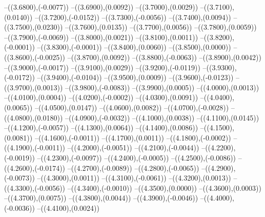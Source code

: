 {	--({\sx*(3.6800)},{\sy*(-0.0077)})
	--({\sx*(3.6900)},{\sy*(0.0092)})
	--({\sx*(3.7000)},{\sy*(0.0029)})
	--({\sx*(3.7100)},{\sy*(0.0140)})
	--({\sx*(3.7200)},{\sy*(-0.0152)})
	--({\sx*(3.7300)},{\sy*(-0.0056)})
	--({\sx*(3.7400)},{\sy*(0.0094)})
	--({\sx*(3.7500)},{\sy*(0.0230)})
	--({\sx*(3.7600)},{\sy*(0.0135)})
	--({\sx*(3.7700)},{\sy*(0.0056)})
	--({\sx*(3.7800)},{\sy*(0.0059)})
	--({\sx*(3.7900)},{\sy*(-0.0069)})
	--({\sx*(3.8000)},{\sy*(0.0021)})
	--({\sx*(3.8100)},{\sy*(0.0011)})
	--({\sx*(3.8200)},{\sy*(-0.0001)})
	--({\sx*(3.8300)},{\sy*(-0.0001)})
	--({\sx*(3.8400)},{\sy*(0.0060)})
	--({\sx*(3.8500)},{\sy*(0.0000)})
	--({\sx*(3.8600)},{\sy*(-0.0025)})
	--({\sx*(3.8700)},{\sy*(0.0092)})
	--({\sx*(3.8800)},{\sy*(-0.0063)})
	--({\sx*(3.8900)},{\sy*(0.0042)})
	--({\sx*(3.9000)},{\sy*(-0.0017)})
	--({\sx*(3.9100)},{\sy*(0.0029)})
	--({\sx*(3.9200)},{\sy*(-0.0119)})
	--({\sx*(3.9300)},{\sy*(-0.0172)})
	--({\sx*(3.9400)},{\sy*(-0.0104)})
	--({\sx*(3.9500)},{\sy*(0.0009)})
	--({\sx*(3.9600)},{\sy*(-0.0123)})
	--({\sx*(3.9700)},{\sy*(0.0013)})
	--({\sx*(3.9800)},{\sy*(-0.0083)})
	--({\sx*(3.9900)},{\sy*(0.0005)})
	--({\sx*(4.0000)},{\sy*(0.0013)})
	--({\sx*(4.0100)},{\sy*(0.0004)})
	--({\sx*(4.0200)},{\sy*(-0.0002)})
	--({\sx*(4.0300)},{\sy*(0.0091)})
	--({\sx*(4.0400)},{\sy*(0.0065)})
	--({\sx*(4.0500)},{\sy*(0.0147)})
	--({\sx*(4.0600)},{\sy*(0.0082)})
	--({\sx*(4.0700)},{\sy*(-0.0028)})
	--({\sx*(4.0800)},{\sy*(0.0180)})
	--({\sx*(4.0900)},{\sy*(-0.0032)})
	--({\sx*(4.1000)},{\sy*(0.0038)})
	--({\sx*(4.1100)},{\sy*(0.0145)})
	--({\sx*(4.1200)},{\sy*(-0.0057)})
	--({\sx*(4.1300)},{\sy*(0.0064)})
	--({\sx*(4.1400)},{\sy*(0.0086)})
	--({\sx*(4.1500)},{\sy*(0.0081)})
	--({\sx*(4.1600)},{\sy*(-0.0011)})
	--({\sx*(4.1700)},{\sy*(0.0011)})
	--({\sx*(4.1800)},{\sy*(-0.0002)})
	--({\sx*(4.1900)},{\sy*(-0.0011)})
	--({\sx*(4.2000)},{\sy*(-0.0051)})
	--({\sx*(4.2100)},{\sy*(-0.0044)})
	--({\sx*(4.2200)},{\sy*(-0.0019)})
	--({\sx*(4.2300)},{\sy*(-0.0097)})
	--({\sx*(4.2400)},{\sy*(-0.0005)})
	--({\sx*(4.2500)},{\sy*(-0.0086)})
	--({\sx*(4.2600)},{\sy*(-0.0174)})
	--({\sx*(4.2700)},{\sy*(-0.0089)})
	--({\sx*(4.2800)},{\sy*(-0.0065)})
	--({\sx*(4.2900)},{\sy*(-0.0073)})
	--({\sx*(4.3000)},{\sy*(0.0011)})
	--({\sx*(4.3100)},{\sy*(-0.0061)})
	--({\sx*(4.3200)},{\sy*(0.0013)})
	--({\sx*(4.3300)},{\sy*(-0.0056)})
	--({\sx*(4.3400)},{\sy*(-0.0010)})
	--({\sx*(4.3500)},{\sy*(0.0000)})
	--({\sx*(4.3600)},{\sy*(0.0003)})
	--({\sx*(4.3700)},{\sy*(0.0075)})
	--({\sx*(4.3800)},{\sy*(0.0044)})
	--({\sx*(4.3900)},{\sy*(-0.0046)})
	--({\sx*(4.4000)},{\sy*(-0.0036)})
	--({\sx*(4.4100)},{\sy*(0.0024)})
}

